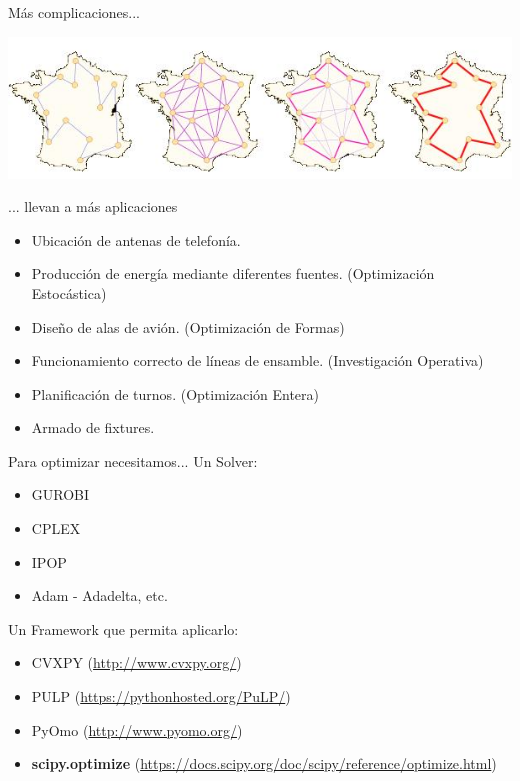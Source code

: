 \documentclass[12pt,aspectratio=169]{beamer}
\begin{document}
\begin{frame}{Más complicaciones...}
\begin{center}
\includegraphics[width=.8\paperwidth]{travelling.jpg}
\end{center}
\end{frame}

\begin{frame}{... llevan a más aplicaciones}
\begin{itemize}
\item Ubicación de antenas de telefonía.
\item Producción de energía mediante diferentes fuentes. (Optimización Estocástica)
\item Diseño de alas de avión. (Optimización de Formas)
\item Funcionamiento correcto de líneas de ensamble. (Investigación Operativa)
\item Planificación de turnos. (Optimización Entera)
\item Armado de fixtures.
\end{itemize}
\end{frame}

\begin{frame}{Para optimizar necesitamos...}
Un Solver:
\begin{itemize}
\item GUROBI
\item CPLEX
\item IPOP
\item Adam - Adadelta, etc.
\end{itemize}

Un Framework que permita aplicarlo:
\begin{itemize}
\item CVXPY (\href{http://www.cvxpy.org/}{http://www.cvxpy.org/})
\item PULP (\href{https://pythonhosted.org/PuLP/}{https://pythonhosted.org/PuLP/})
\item PyOmo (\href{http://www.pyomo.org/}{http://www.pyomo.org/})
\item \textbf{scipy.optimize} (\href{https://docs.scipy.org/doc/scipy/reference/optimize.html}{https://docs.scipy.org/doc/scipy/reference/optimize.html})
\end{itemize}
\end{frame}
\end{document}
